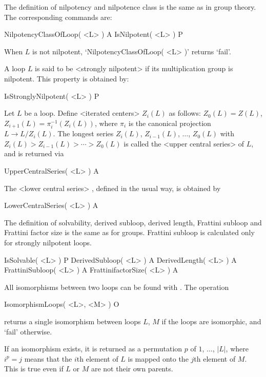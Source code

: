 
The definition of nilpotency and nilpotence class is the same as in group
theory. The corresponding commands are:

\>NilpotencyClassOfLoop( <L> ) A
\>IsNilpotent( <L> ) P

When $L$ is not nilpotent, `NilpotencyClassOfLoop( <L> )' returns `fail'.

A loop $L$ is said to be <strongly nilpotent> if its multiplication group is nilpotent. This property is obtained by:

\>IsStronglyNilpotent( <L> ) P

Let $L$ be a loop. Define <iterated centers>
%
%
 $Z_i(L)$ as
follows: $Z_0(L)=Z(L)$, $Z_{i+1}(L) = \pi_i^{-1}( Z_i(L) )$, where $\pi_i$ is
the canonical projection $L\to L/Z_i(L)$. The longest series $Z_i(L)$,
$Z_{i-1}(L)$, $\dots$, $Z_0(L)$ with $Z_i(L)>Z_{i-1}(L)>\cdots >Z_0(L)$ is
called the <upper central series>
%
%
 of $L$, and is returned via

\>UpperCentralSeries( <L> ) A

The <lower central series>
%
%
, defined in the usual way, is obtained by

\>LowerCentralSeries( <L> ) A


The definition of solvability, derived subloop, derived length, Frattini
subloop and Frattini factor size is the same as for groups. Frattini subloop is
calculated only for strongly nilpotent loops.

\>IsSolvable( <L> ) P
\>DerivedSubloop( <L> ) A
\>DerivedLength( <L> ) A
\>FrattiniSubloop( <L> ) A
\>FrattinifactorSize( <L> ) A


All isomorphisms between two loops can be found with {\LOOPS}. The operation

\>IsomorphismLoops( <L>, <M> ) O

returns a single isomorphism between loops $L$, $M$ if the loops are
isomorphic, and `fail' otherwise.

If an isomorphism exists, it is returned as a permutation $p$ of $1$, $\dots$,
$|L|$, where $i^p=j$ means that the $i$th element of $L$ is mapped onto the
$j$th element of $M$. This is true even if $L$ or $M$ are not their own
parents.

